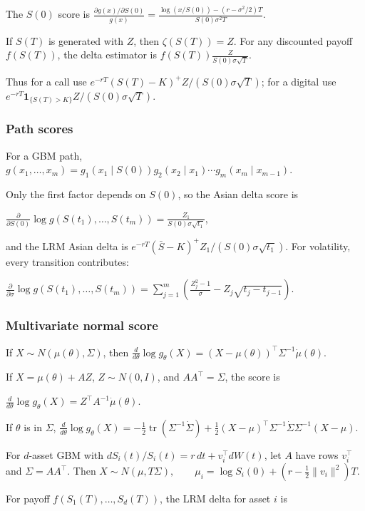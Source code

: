 The $S(0)$ score is
$\frac{\partial g(x)/\partial S(0)}{g(x)}=\frac{\log(x/S(0))-(r-\sigma^2/2)T}{S(0)\sigma^2T}$.

If $S(T)$ is generated with $Z$, then $\zeta(S(T))=Z$. For any discounted payoff $f(S(T))$, the delta estimator is
$f(S(T))\frac{Z}{S(0)\sigma\sqrt T}$.

Thus for a call use $e^{-rT}(S(T)-K)^+Z/(S(0)\sigma\sqrt T)$; for a digital use $e^{-rT}\mathbf{1}_{\{S(T)>K\}}Z/(S(0)\sigma\sqrt T)$.

\subsubsection*{Path scores}

For a GBM path,
$g(x_1,\ldots,x_m)=g_1(x_1\mid S(0))g_2(x_2\mid x_1)\cdots g_m(x_m\mid x_{m-1})$.

Only the first factor depends on $S(0)$, so the Asian delta score is

$\frac{\partial}{\partial S(0)}\log g(S(t_1),\ldots,S(t_m))=\frac{Z_1}{S(0)\sigma\sqrt{t_1}}$,

and the LRM Asian delta is $e^{-rT}(\bar S-K)^+Z_1/(S(0)\sigma\sqrt{t_1})$. For volatility, every transition contributes:

$\frac{\partial}{\partial\sigma}\log g(S(t_1),\ldots,S(t_m))=\sum_{j=1}^m\left(\frac{Z_j^2-1}{\sigma}-Z_j\sqrt{t_j-t_{j-1}}\right)$.

\subsubsection*{Multivariate normal score}

If $X\sim N(\mu(\theta),\Sigma)$, then
$\frac{d}{d\theta}\log g_\theta(X)=(X-\mu(\theta))^\top\Sigma^{-1}\dot\mu(\theta)$.

If $X=\mu(\theta)+AZ$, $Z\sim N(0,I)$, and $AA^\top=\Sigma$, the score is

$\frac{d}{d\theta}\log g_\theta(X)=Z^\top A^{-1}\dot\mu(\theta)$.

If $\theta$ is in $\Sigma$,
$\frac{d}{d\theta}\log g_\theta(X)=-\frac12\operatorname{tr}(\Sigma^{-1}\dot\Sigma)+\frac12(X-\mu)^\top\Sigma^{-1}\dot\Sigma\Sigma^{-1}(X-\mu)$.

For $d$-asset GBM with $dS_i(t)/S_i(t)=r\,dt+v_i^\top dW(t)$, let $A$ have rows $v_i^\top$ and $\Sigma=AA^\top$. Then
$X\sim N(\mu,T\Sigma),\qquad \mu_i=\log S_i(0)+(r-\frac12\|v_i\|^2)T$.

For payoff $f(S_1(T),\ldots,S_d(T))$, the LRM delta for asset $i$ is

